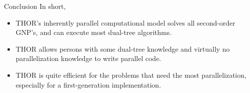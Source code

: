 \documentclass[pdf,colorBG,slideColor]{prosper}
\begin{document}
\begin{slide}{Conclusion}
  In short,
  \begin{itemize}
    \item THOR's inherently parallel computational model solves all
    second-order GNP's, and can execute most dual-tree algorithms.
    \item THOR allows persons with some dual-tree knowledge
    and virtually no parallelization knowledge to write parallel code.
    \item THOR is quite efficient for the problems that need
    the most parallelization, especially for a first-generation
    implementation. 
  \end{itemize}
\end{slide}
\end{document}
